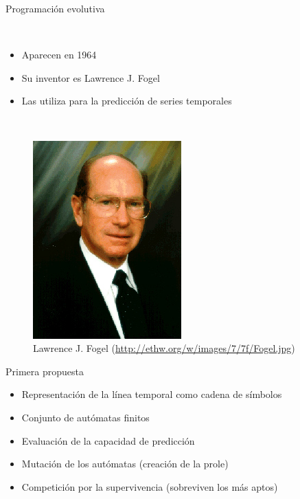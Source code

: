 \documentclass[10pt]{beamer}
\begin{document}
\begin{frame}[fragile]{Programación evolutiva}
  \begin{multicols}{2}
    ~\\
    \begin{itemize}
    \item Aparecen en 1964
    \item Su inventor es Lawrence J. Fogel
    \item Las utiliza para la predicción de series temporales
    \end{itemize}
    ~\\
    \begin{figure}[H]
      \centering
      \includegraphics[scale=.5]{imgs/Fogel}
      \caption{Lawrence J. Fogel (\footnotesize{\url{http://ethw.org/w/images/7/7f/Fogel.jpg})}}
    \end{figure}
  \end{multicols}
\end{frame}

\begin{frame}{Primera propuesta}
  \begin{itemize}
  \item Representación de la línea temporal como cadena de símbolos
  \item Conjunto de autómatas finitos
  \item Evaluación de la capacidad de predicción
  \item Mutación de los autómatas (creación de la prole)
  \item Competición por la supervivencia (sobreviven los más aptos)
  \end{itemize}
\end{frame}
\end{document}

